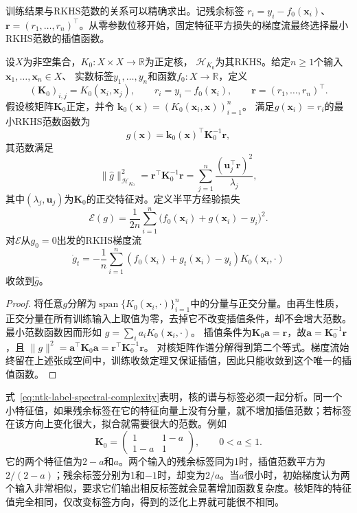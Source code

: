 训练结果与RKHS范数的关系可以精确求出。记残余标签
$r_i=y_i-f_0(\bm x_i)$、$\bm r=(r_1,\ldots,r_n)^\top$。从零参数位移开始，固定特征平方损失的梯度流最终选择最小RKHS范数的插值函数。

\begin{theorem}[初始梯度特征的最小范数插值]
\label{thm:ntk-minimum-rkhs-norm}
设$X$为非空集合，$K_0:X\times X\to\mathbb R$为正定核，
$\mathcal H_{K_0}$为其RKHS。给定$n\geq1$个输入$\bm x_1,\ldots,\bm x_n\in X$、
实数标签$y_1,\ldots,y_n$和函数$f_0:X\to\mathbb R$，定义
\[
 (\bm K_0)_{i,j}=K_0(\bm x_i,\bm x_j),\qquad
 r_i=y_i-f_0(\bm x_i),\qquad
 \bm r=(r_1,\ldots,r_n)^\top.
\]
假设核矩阵$\bm K_0$正定，并令
$\bm k_0(\bm x)=(K_0(\bm x_i,\bm x))_{i=1}^{n}$。
满足$g(\bm x_i)=r_i$的最小RKHS范数函数为
\[
 \widehat g(\bm x)=\bm k_0(\bm x)^\top\bm K_0^{-1}\bm r,
\]
其范数满足
\begin{equation}
 \|\widehat g\|_{\mathcal H_{K_0}}^2
 =\bm r^\top\bm K_0^{-1}\bm r
 =\sum_{j=1}^n\frac{(\bm u_j^\top\bm r)^2}{\lambda_j},
 \label{eq:ntk-label-spectral-complexity}
\end{equation}
其中$(\lambda_j,\bm u_j)$为$\bm K_0$的正交特征对。定义半平方经验损失
\[
 \mathcal E(g)=\frac1{2n}\sum_{i=1}^n
 \bigl(f_0(\bm x_i)+g(\bm x_i)-y_i\bigr)^2.
\]
对$\mathcal E$从$g_0=0$出发的RKHS梯度流
\[
 \dot g_t=-\frac1n\sum_{i=1}^n
 (f_0(\bm x_i)+g_t(\bm x_i)-y_i)K_0(\bm x_i,\cdot)
\]
收敛到$\widehat g$。
\end{theorem}
\begin{proof}
将任意$g$分解为$\operatorname{span}\{K_0(\bm x_i,\cdot)\}_{i=1}^n$中的分量与正交分量。由再生性质，正交分量在所有训练输入上取值为零，去掉它不改变插值条件，却不会增大范数。最小范数函数因而形如
$g=\sum_i a_iK_0(\bm x_i,\cdot)$。
插值条件为$\bm K_0\bm a=\bm r$，故$\bm a=\bm K_0^{-1}\bm r$，且
$\|g\|^2=\bm a^\top\bm K_0\bm a=\bm r^\top\bm K_0^{-1}\bm r$。
对核矩阵作谱分解得到第二个等式。梯度流始终留在上述张成空间中，训练收敛定理又保证插值，因此只能收敛到这个唯一的插值函数。
\end{proof}

式~\eqref{eq:ntk-label-spectral-complexity}表明，核的谱与标签必须一起分析。同一个小特征值，如果残余标签在它的特征向量上没有分量，就不增加插值范数；若标签在该方向上变化很大，拟合就需要很大的范数。例如
\[
 \bm K_0=\begin{pmatrix}1&1-a\\1-a&1\end{pmatrix},\qquad 0<a\leq1.
\]
它的两个特征值为$2-a$和$a$。两个输入的残余标签同为1时，插值范数平方为$2/(2-a)$；残余标签分别为1和$-1$时，却变为$2/a$。当$a$很小时，初始梯度认为两个输入非常相似，要求它们输出相反标签就会显著增加函数复杂度。核矩阵的特征值完全相同，仅改变标签方向，得到的泛化上界就可能很不相同。

